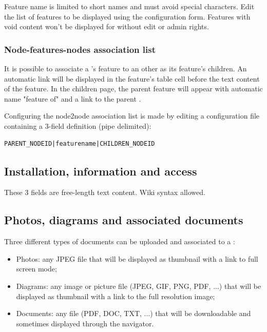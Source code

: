 Feature name is limited to short names and must avoid special characters. Edit the list of features to be displayed using the  configuration form. Features with void content won't be displayed for  without edit or admin rights.

\subsubsection{Node-features-nodes association list}

It is possible to associate a 's feature to an other  as its feature's children. An automatic link will be displayed in the feature's table cell before the text content of the feature. In the children  page, the parent feature will appear with automatic name "feature of" and a link to the parent .

Configuring the node2node association list is made by editing a configuration file containing a 3-field definition (pipe delimited):

\begin{lstlisting}[title=\wofile{nodes2nodes.rc} (excerpt)]
PARENT_NODEID|featurename|CHILDREN_NODEID
\end{lstlisting}


\subsection{Installation, information and access}

These 3 fields are free-length text content. Wiki syntax allowed.

\subsection{Photos, diagrams and associated documents}

Three different types of documents can be uploaded and associated to a :
\begin{itemize}
	\item Photos: any JPEG file that will be displayed as thumbnail with a link to full screen mode;
	\item Diagrams: any image or picture file (JPEG, GIF, PNG, PDF, ...) that will be displayed as thumbnail with a link to the full resolution image;
	\item Documents: any file (PDF, DOC, TXT, ...) that will be downloadable and sometimes displayed through the navigator.
\end{itemize}


